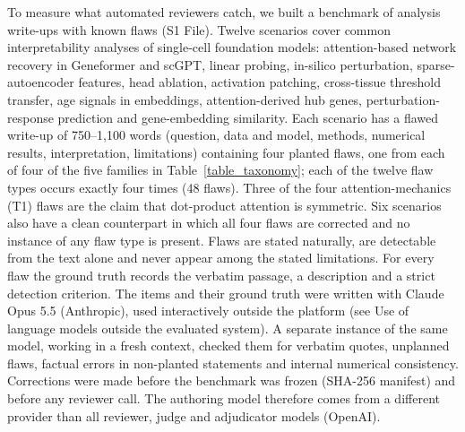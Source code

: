To measure what automated reviewers catch, we built a benchmark of analysis write-ups with known flaws (S1 File). Twelve scenarios cover common interpretability analyses of single-cell foundation models: attention-based network recovery in Geneformer and scGPT, linear probing, in-silico perturbation, sparse-autoencoder features, head ablation, activation patching, cross-tissue threshold transfer, age signals in embeddings, attention-derived hub genes, perturbation-response prediction and gene-embedding similarity. Each scenario has a flawed write-up of 750--1,100 words (question, data and model, methods, numerical results, interpretation, limitations) containing four planted flaws, one from each of four of the five families in Table~\ref{table_taxonomy}; each of the twelve flaw types occurs exactly four times (48 flaws). Three of the four attention-mechanics (T1) flaws are the claim that dot-product attention is symmetric. Six scenarios also have a clean counterpart in which all four flaws are corrected and no instance of any flaw type is present. Flaws are stated naturally, are detectable from the text alone and never appear among the stated limitations. For every flaw the ground truth records the verbatim passage, a description and a strict detection criterion. The items and their ground truth were written with Claude Opus 5.5 (Anthropic), used interactively outside the platform (see Use of language models outside the evaluated system). A separate instance of the same model, working in a fresh context, checked them for verbatim quotes, unplanned flaws, factual errors in non-planted statements and internal numerical consistency. Corrections were made before the benchmark was frozen (SHA-256 manifest) and before any reviewer call. The authoring model therefore comes from a different provider than all reviewer, judge and adjudicator models (OpenAI).

